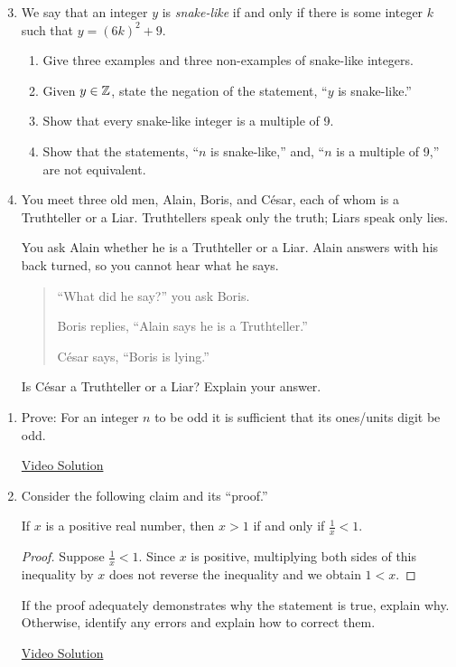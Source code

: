 \begin{enumerate}\setcounter{enumi}{2}	
	\item We say that an integer $y$ is \emph{snake-like} if and only if there is some integer $k$ such that $y=(6k)^2+9$.
	\begin{enumerate}
	  \item Give three examples and three non-examples of snake-like integers.
	  \item Given $y\in\mathbb{Z}$, state the negation of the statement, ``$y$ is snake-like.''
	  \item Show that every snake-like integer is a multiple of 9.
	  \item Show that the statements, ``$n$ is snake-like,'' and, ``$n$ is a multiple of 9,'' are not equivalent.
	\end{enumerate}
  
  
	\item You meet three old men, Alain, Boris, and César, each of whom is a Truthteller or a Liar. Truthtellers speak only the truth; Liars speak only lies.\par
	You ask Alain whether he is a Truthteller or a Liar. Alain answers with his back turned, so you cannot hear what he says.
	\begin{quote}
		``What did he say?'' you ask Boris.\par
		Boris replies, ``Alain says he is a Truthteller.''\par
		César says, ``Boris is lying.''	
	\end{quote}
	Is César a Truthteller or a Liar? Explain your answer.
 
\end{enumerate}


\clearpage



\begin{enumerate}
  \item Prove: For an integer $n$ to be odd it is sufficient that its ones/units digit be odd.\par
  \href{https://youtu.be/9wHi0ojmvDg}{Video Solution}
  
  \item Consider the following claim and its ``proof.''
    \begin{thm*}{}{}
      If $x$ is a positive real number, then $x > 1$ if and only if $\frac 1x<1$.
    \end{thm*}
    \begin{proof}
      Suppose $\frac 1x<1$. Since $x$ is positive, multiplying both sides of this inequality by $x$ does not reverse the inequality and we obtain $1<x$.
    \end{proof}
    
    If the proof adequately demonstrates why the statement is true, explain why.
    Otherwise, identify any errors and explain how to correct them.\par
	\href{https://youtu.be/R_W3wwJRlmQ}{Video Solution}
\end{enumerate}
